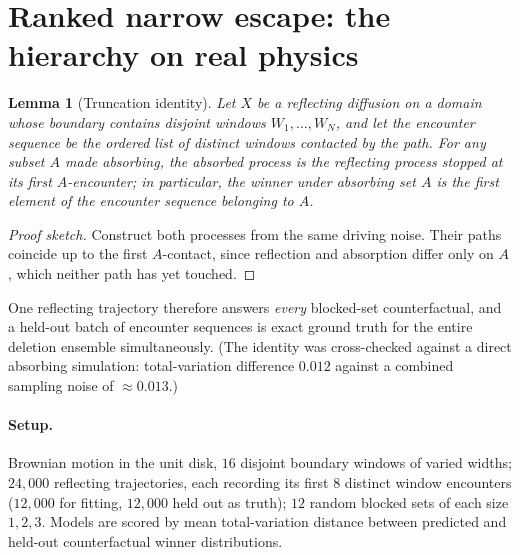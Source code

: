 \documentclass[11pt]{article}
\newtheorem{lemma}{Lemma}
\theoremstyle{remark}
\begin{document}
\section{Ranked narrow escape: the hierarchy on real physics}\label{sec:experiments}

\begin{lemma}[Truncation identity]\label{lem:trunc}
Let $X$ be a reflecting diffusion on a domain whose boundary contains disjoint
windows $W_1, \dots, W_N$, and let the encounter sequence be the ordered list of
distinct windows contacted by the path. For any subset $A$ made absorbing, the
absorbed process is the reflecting process stopped at its first $A$-encounter; in
particular, the winner under absorbing set $A$ is the first element of the
encounter sequence belonging to $A$.
\end{lemma}

\begin{proof}[Proof sketch]
Construct both processes from the same driving noise. Their paths coincide up to
the first $A$-contact, since reflection and absorption differ only on $A$, which
neither path has yet touched. \qedhere
\end{proof}

One reflecting trajectory therefore answers \emph{every} blocked-set counterfactual,
and a held-out batch of encounter sequences is exact ground truth for the entire
deletion ensemble simultaneously. (The identity was cross-checked against a direct
absorbing simulation: total-variation difference $0.012$ against a combined sampling
noise of $\approx 0.013$.)

\paragraph{Setup.} Brownian motion in the unit disk, $16$ disjoint boundary windows
of varied widths; $24{,}000$ reflecting trajectories, each recording its first $8$
distinct window encounters ($12{,}000$ for fitting, $12{,}000$ held out as truth);
$12$ random blocked sets of each size $1, 2, 3$. Models are scored by mean
total-variation distance between predicted and held-out counterfactual winner
distributions.
\end{document}
